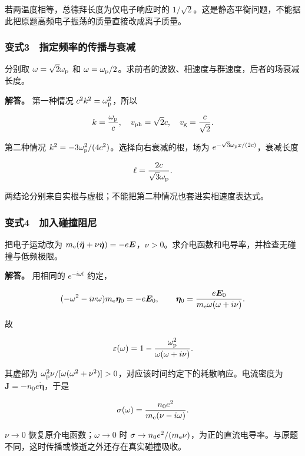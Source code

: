 \documentclass[12pt,a4paper,fontset=fandol]{ctexart}
\begin{document}
若两温度相等，总德拜长度为仅电子响应时的
\(1/\sqrt2\)。这是静态平衡问题，不能据此把原题高频电子振荡的质量直接改成离子质量。

\subsubsection{变式3　指定频率的传播与衰减}\label{ux53d8ux5f0f3-ux6307ux5b9aux9891ux7387ux7684ux4f20ux64adux4e0eux8870ux51cf}

分别取 \(\omega=\sqrt2\omega_{\rm p}\) 和
\(\omega=\omega_{\rm p}/2\)。求前者的波数、相速度与群速度，后者的场衰减长度。

\textbf{解答。} 第一种情况 \(c^2k^2=\omega_{\rm p}^2\)，所以

\[
k=\frac{\omega_{\rm p}}c,\quad
v_{\rm ph}=\sqrt2c,\quad v_{\rm g}=\frac c{\sqrt2}.
\]

第二种情况 \(k^2=-3\omega_{\rm p}^2/(4c^2)\)。选择向右衰减的根，场为
\(e^{-\sqrt3\omega_{\rm p}x/(2c)}\)，衰减长度

\[
\ell=\frac{2c}{\sqrt3\omega_{\rm p}}.
\]

两结论分别来自实根与虚根；不能把第二种情况也套进实相速度表达式。

\subsubsection{变式4　加入碰撞阻尼}\label{ux53d8ux5f0f4-ux52a0ux5165ux78b0ux649eux963bux5c3c}

把电子运动改为
\(m_{\rm e}(\ddot{\boldsymbol\eta}+\nu\dot{\boldsymbol\eta})=-e\boldsymbol E\)，\(\nu>0\)。求介电函数和电导率，并检查无碰撞与低频极限。

\textbf{解答。} 用相同的 \(e^{-i\omega t}\) 约定，

\[
(-\omega^2-i\nu\omega)m_{\rm e}\boldsymbol\eta_0=-e\boldsymbol E_0,
\qquad
\boldsymbol\eta_0=\frac{e\boldsymbol E_0}
{m_{\rm e}\omega(\omega+i\nu)}.
\]

故

\[
\varepsilon(\omega)=1-\frac{\omega_{\rm p}^2}{\omega(\omega+i\nu)}.
\]

其虚部为
\(\omega_{\rm p}^2\nu/[\omega(\omega^2+\nu^2)]>0\)，对应该时间约定下的耗散响应。电流密度为
\(\boldsymbol J=-n_0e\dot{\boldsymbol\eta}\)，于是

\[
\sigma(\omega)=\frac{n_0e^2}{m_{\rm e}(\nu-i\omega)}.
\]

\(\nu\to0\) 恢复原介电函数；\(\omega\to0\) 时
\(\sigma\to n_0e^2/(m_{\rm e}\nu)\)，为正的直流电导率。与原题不同，这时传播或倏逝之外还存在真实碰撞吸收。
\end{document}
